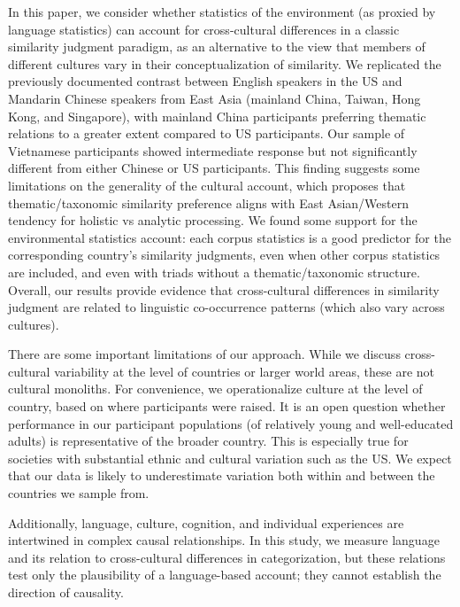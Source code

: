 \documentclass[10pt, letterpaper]{article}
\begin{document}
In this paper, we consider whether statistics of the environment (as
proxied by language statistics) can account for cross-cultural
differences in a classic similarity judgment paradigm, as an alternative
to the view that members of different cultures vary in their
conceptualization of similarity. We replicated the previously documented
contrast between English speakers in the US and Mandarin Chinese
speakers from East Asia (mainland China, Taiwan, Hong Kong, and
Singapore), with mainland China participants preferring thematic
relations to a greater extent compared to US participants. Our sample of
Vietnamese participants showed intermediate response but not
significantly different from either Chinese or US participants. This
finding suggests some limitations on the generality of the cultural
account, which proposes that thematic/taxonomic similarity preference
aligns with East Asian/Western tendency for holistic vs analytic
processing. We found some support for the environmental statistics
account: each corpus statistics is a good predictor for the
corresponding country's similarity judgments, even when other corpus
statistics are included, and even with triads without a
thematic/taxonomic structure. Overall, our results provide evidence that
cross-cultural differences in similarity judgment are related to
linguistic co-occurrence patterns (which also vary across cultures).

There are some important limitations of our approach. While we discuss
cross-cultural variability at the level of countries or larger world
areas, these are not cultural monoliths. For convenience, we
operationalize culture at the level of country, based on where
participants were raised. It is an open question whether performance in
our participant populations (of relatively young and well-educated
adults) is representative of the broader country. This is especially
true for societies with substantial ethnic and cultural variation such
as the US. We expect that our data is likely to underestimate variation
both within and between the countries we sample from.

Additionally, language, culture, cognition, and individual experiences
are intertwined in complex causal relationships. In this study, we
measure language and its relation to cross-cultural differences in
categorization, but these relations test only the plausibility of a
language-based account; they cannot establish the direction of
causality.
\end{document}
